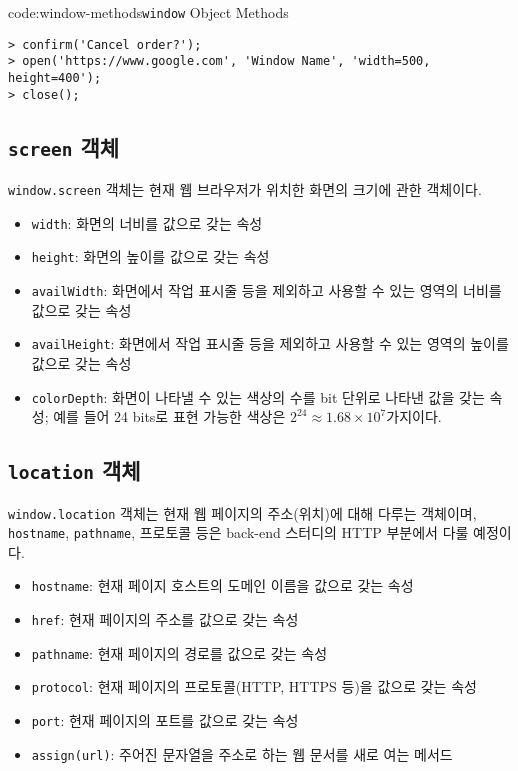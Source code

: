 \begin{codeenv}{code:window-methods}{\texttt{window} Object Methods}\begin{verbatim}
> confirm('Cancel order?');
> open('https://www.google.com', 'Window Name', 'width=500, height=400');
> close();
\end{verbatim}
\end{codeenv}
\newpage

\subsection*{\texttt{screen} 객체}

\texttt{window.screen} 객체는 현재 웹 브라우저가 위치한 화면의 크기에 관한 객체이다.

\begin{itemize}
    \item \texttt{width}: 화면의 너비를 값으로 갖는 속성
    \item \texttt{height}: 화면의 높이를 값으로 갖는 속성
    \item \texttt{availWidth}: 화면에서 작업 표시줄 등을 제외하고 사용할 수 있는 영역의 너비를 값으로 갖는 속성
    \item \texttt{availHeight}: 화면에서 작업 표시줄 등을 제외하고 사용할 수 있는 영역의 높이를 값으로 갖는 속성
    \item \texttt{colorDepth}: 화면이 나타낼 수 있는 색상의 수를 bit 단위로 나타낸 값을 갖는 속성; 예를 들어 24 bits로 표현 가능한 색상은 $2^{24} \approx 1.68 \times 10^7$가지이다.
\end{itemize}

\subsection*{\texttt{location} 객체}

\texttt{window.location} 객체는 현재 웹 페이지의 주소(위치)에 대해 다루는 객체이며, \texttt{hostname}, \texttt{pathname}, 프로토콜 등은 back-end 스터디의 HTTP 부분에서 다룰 예정이다.

\begin{itemize}
    \item \texttt{hostname}: 현재 페이지 호스트의 도메인 이름을 값으로 갖는 속성
    \item \texttt{href}: 현재 페이지의 주소를 값으로 갖는 속성
    \item \texttt{pathname}: 현재 페이지의 경로를 값으로 갖는 속성
    \item \texttt{protocol}: 현재 페이지의 프로토콜(HTTP, HTTPS 등)을 값으로 갖는 속성
    \item \texttt{port}: 현재 페이지의 포트를 값으로 갖는 속성
    \item \texttt{assign(url)}: 주어진 문자열을 주소로 하는 웹 문서를 새로 여는 메서드
\end{itemize}

